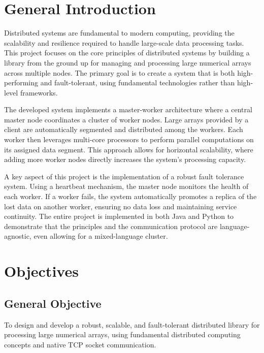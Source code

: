 \documentclass[10pt,a4paper]{article}
\theoremstyle{definition}
\theoremstyle{remark}
\begin{document}
\newpage
\tableofcontents
\newpage

\section{General Introduction}

Distributed systems are fundamental to modern computing, providing the scalability and resilience required to handle large-scale data processing tasks. This project focuses on the core principles of distributed systems by building a library from the ground up for managing and processing large numerical arrays across multiple nodes. The primary goal is to create a system that is both high-performing and fault-tolerant, using fundamental technologies rather than high-level frameworks.

The developed system implements a master-worker architecture where a central master node coordinates a cluster of worker nodes. Large arrays provided by a client are automatically segmented and distributed among the workers. Each worker then leverages multi-core processors to perform parallel computations on its assigned data segment. This approach allows for horizontal scalability, where adding more worker nodes directly increases the system's processing capacity.

A key aspect of this project is the implementation of a robust fault tolerance system. Using a heartbeat mechanism, the master node monitors the health of each worker. If a worker fails, the system automatically promotes a replica of the lost data on another worker, ensuring no data loss and maintaining service continuity. The entire project is implemented in both Java and Python to demonstrate that the principles and the communication protocol are language-agnostic, even allowing for a mixed-language cluster.

\section{Objectives}

\subsection{General Objective}
To design and develop a robust, scalable, and fault-tolerant distributed library for processing large numerical arrays, using fundamental distributed computing concepts and native TCP socket communication.
\end{document}
